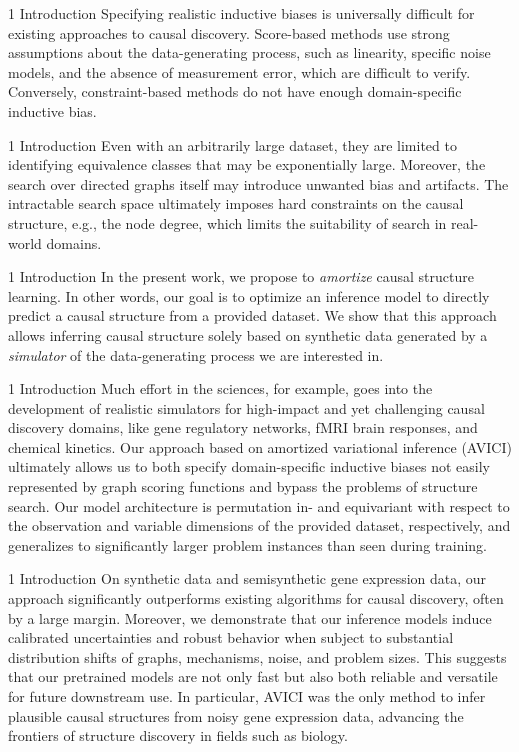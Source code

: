 \documentclass[aspectratio=169,10pt]{beamer}
\newcommand{\ours}{AVICI\xspace}
\begin{document}
\begin{frame}{1 Introduction}
Specifying realistic inductive biases is universally difficult for existing approaches to causal discovery. Score-based methods use strong assumptions about the data-generating process, such as linearity, specific noise models, and the absence of measurement error, which are difficult to verify. Conversely, constraint-based methods do not have enough domain-specific inductive bias.
\end{frame}

\begin{frame}{1 Introduction}
Even with an arbitrarily large dataset, they are limited to identifying equivalence classes that may be exponentially large. Moreover, the search over directed graphs itself may introduce unwanted bias and artifacts. The intractable search space ultimately imposes hard constraints on the causal structure, e.g., the node degree, which limits the suitability of search in real-world domains.
\end{frame}

\begin{frame}{1 Introduction}
In the present work, we propose to \emph{amortize} causal structure learning. In other words, our goal is to optimize an inference model to directly predict a causal structure from a provided dataset. We show that this approach allows inferring causal structure solely based on synthetic data generated by a \emph{simulator} of the data-generating process we are interested in.
\end{frame}

\begin{frame}{1 Introduction}
Much effort in the sciences, for example, goes into the development of realistic simulators for high-impact and yet challenging causal discovery domains, like gene regulatory networks, fMRI brain responses, and chemical kinetics. Our approach based on amortized variational inference (\ours) ultimately allows us to both specify domain-specific inductive biases not easily represented by graph scoring functions and bypass the problems of structure search. Our model architecture is permutation in- and equivariant with respect to the observation and variable dimensions of the provided dataset, respectively, and generalizes to significantly larger problem instances than seen during training.
\end{frame}

\begin{frame}{1 Introduction}
On synthetic data and semisynthetic gene expression data, our approach significantly outperforms existing algorithms for causal discovery, often by a large margin. Moreover, we demonstrate that our inference models induce calibrated uncertainties and robust behavior when subject to substantial distribution shifts of graphs, mechanisms, noise, and problem sizes. This suggests that our pretrained models are not only fast but also both reliable and versatile for future downstream use. In particular, \ours was the only method to infer plausible causal structures from noisy gene expression data, advancing the frontiers of structure discovery in fields such as biology.
\end{frame}
\end{document}
